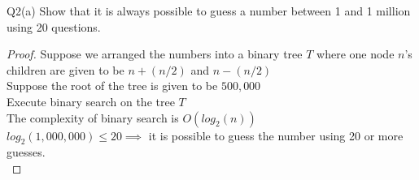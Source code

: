 \begin{problem}
  {Q2(a)}
  Show that it is always possible to guess a number between 1 and 1 million using 20 questions.
  \begin{proof}
    Suppose we arranged the numbers into a binary tree $T$ where one node $n$'s children are given to be $n + (n / 2)$ and $n - (n / 2)$ \\
    Suppose the root of the tree is given to be $500,000$ \\
    Execute binary search on the tree $T$ \\
    The complexity of binary search is $O(log_2(n))$ \\
    $log_2(1,000,000) \leq 20 \implies $ it is possible to guess the number using 20 or more guesses. \\
  \end{proof}
\end{problem}
